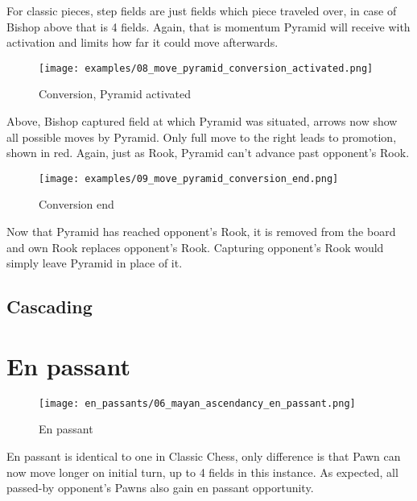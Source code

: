 For classic pieces, step fields are just fields which piece traveled over,
in case of Bishop above that is 4 fields. Again, that is momentum Pyramid
will receive with activation and limits how far it could move afterwards.

\clearpage

\noindent
\begin{figure}[!h]
\texttt{[image: examples/08\_move\_pyramid\_conversion\_activated.png]}
\caption{Conversion, Pyramid activated}
\label{fig:ma_conversion_activated}
\end{figure}

Above, Bishop captured field at which Pyramid was situated, arrows now show
all possible moves by Pyramid. Only full move to the right leads to promotion,
shown in red. Again, just as Rook, Pyramid can't advance past opponent's Rook.

\clearpage

\noindent
\begin{figure}[!h]
\texttt{[image: examples/09\_move\_pyramid\_conversion\_end.png]}
\caption{Conversion end}
\label{fig:ma_conversion_end}
\end{figure}

Now that Pyramid has reached opponent's Rook, it is removed from the board and
own Rook replaces opponent's Rook. Capturing opponent's Rook would simply leave
Pyramid in place of it.

\clearpage

\subsection*{Cascading}


\clearpage

\section*{En passant}

\noindent
\begin{wrapfigure}{l}{0.4\textwidth}
\texttt{[image: en\_passants/06\_mayan\_ascendancy\_en\_passant.png]}
\caption{En passant}
\label{fig:ma_en_passant}
\end{wrapfigure}
En passant is identical to one in Classic Chess, only difference is that Pawn can now
move longer on initial turn, up to 4 fields in this instance. As expected, all passed-by
opponent's Pawns also gain en passant opportunity.

